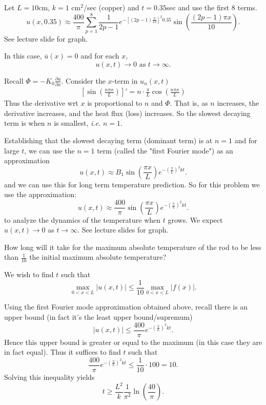 \documentclass[class=article,crop=false]{standalone}
\begin{document}
\begin{eg}[]
	Let $ L=10$cm,  $ k=1$ cm$ ^2$/sec (copper) and $ t=0.35$sec and use the first 8 terms.
	 \[
		 u(x,0.35) \approx \frac{400}{\pi} \sum_{ p= 1}^{ 8} \frac{1}{2p-1} e^{-[(2p-1) \frac{\pi}{10}]^2 0.35} \sin \left( \frac{(2p-1) \pi x}{10 } \right) 
	.\] 
	See lecture slide for graph.

	In this case, $ \overline{u}(x)=0$ and for each $ x$,
	 \[
		 u(x,t) \to 0 \text{ as } t \to \infty 
	.\] 
\begin{note}[]
	Recall $ \Phi = -K_0 \frac{\partial u}{\partial x} $. Consider the $ x$-term in  $ u_n(x,t)$
\begin{align*}
	\left[ \sin \left( \frac{ n\pi x}{ L} \right)  \right]' = n \cdot \frac{\pi}{L} \cos \left( \frac{ n\pi x}{ L} \right)  
\end{align*}
Thus the derivative wrt $ x$ is proportional to $ n$ and  $ \Phi$. That is, as $n $ increases, the derivative increases, and the heat flux (loss) increases. So the slowest decaying term is when $ n$ is smallest,  \emph{i.e.} $ n=1$. 
\end{note}

Establishing that the slowest decaying term (dominant term) is at $ n=1$ and for large  $ t$, we can use the  $ n=1$ term (called the "first Fourier mode") as an approximation
	 \[
		 u(x,t) \approx B_1 \sin \left( \frac{ \pi x}{ L} \right) e^{-( \frac{ \pi}{L} )^2 kt} 
	.\] 
	and we can use this for long term temperature prediction.
So for this problem we use the approximation:
\[
	u(x,t) \approx \frac{400}{\pi} \sin \left( \frac{ \pi x}{ L} \right) e^{-( \frac{ \pi}{L} )^2 kt} 
.\] 
to analyze the dynamics of the temperature when $ t $ grows. We expect $ u(x,t) \to 0 $ as $ t \to \infty$. See lecture slides for graph. 
\end{eg}

\begin{eg}
How long will it take for the maximum absolute temperature of the rod to be less than $ \frac{1}{10}$ the initial maximum absolute temperature?

We wish to find $ t$  such that 
\[
	\max_{0<x<L} |u(x,t)| \leq \frac{1}{10} \max_{0<x<L} |f(x)|
.\]

Using the first Fourier mode approximation obtained above, recall there is an upper bound (in fact it's the least upper bound/supremum)
\[
	|u(x,t)| \leq \frac{400}{\pi} e^{-(\frac{\pi}{L})^2 kt}
.\] 
Hence this upper bound is greater or equal to the maximum (in this case they are in fact equal). Thus it suffices to find $ t$  such that 
\[
	\frac{400}{\pi} e^{-(\frac{\pi}{L})^2 kt} \leq \frac{1}{10} \cdot 100 = 10
.\] 
Solving this inequality yields
\[
	t \geq \frac{L^2}{k}\frac{1}{\pi^2} \ln \left( \frac{40}{\pi} \right) 
.\] 
\end{eg}
\end{document}
